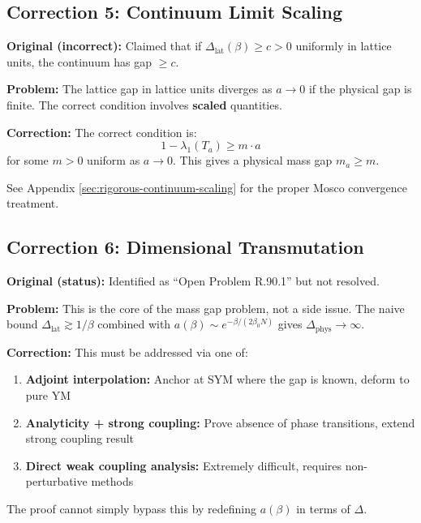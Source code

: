 \subsection{Correction 5: Continuum Limit Scaling}

\begin{correction}
\textbf{Original (incorrect):} Claimed that if $\Delta_{\text{lat}}(\beta) \geq c > 0$ uniformly in lattice units, the continuum has gap $\geq c$.

\textbf{Problem:} The lattice gap in lattice units diverges as $a \to 0$ if the physical gap is finite. The correct condition involves \textbf{scaled} quantities.

\textbf{Correction:} The correct condition is:
\begin{equation}
    1 - \lambda_1(T_a) \geq m \cdot a
\end{equation}
for some $m > 0$ uniform as $a \to 0$. This gives a physical mass gap $m_a \geq m$.

See Appendix \ref{sec:rigorous-continuum-scaling} for the proper Mosco convergence treatment.
\end{correction}

\subsection{Correction 6: Dimensional Transmutation}

\begin{correction}
\textbf{Original (status):} Identified as ``Open Problem R.90.1'' but not resolved.

\textbf{Problem:} This is the core of the mass gap problem, not a side issue. The naive bound $\Delta_{\text{lat}} \gtrsim 1/\beta$ combined with $a(\beta) \sim e^{-\beta/(2\beta_0 N)}$ gives $\Delta_{\text{phys}} \to \infty$.

\textbf{Correction:} This must be addressed via one of:
\begin{enumerate}
    \item \textbf{Adjoint interpolation:} Anchor at SYM where the gap is known, deform to pure YM
    \item \textbf{Analyticity + strong coupling:} Prove absence of phase transitions, extend strong coupling result
    \item \textbf{Direct weak coupling analysis:} Extremely difficult, requires non-perturbative methods
\end{enumerate}

The proof cannot simply bypass this by redefining $a(\beta)$ in terms of $\Delta$.
\end{correction}


